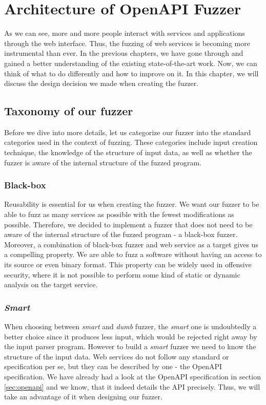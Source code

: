 \chapter{Architecture of OpenAPI Fuzzer}
As we can see, more and more people interact with services and applications through the web interface. Thus, the fuzzing of web services is becoming more instrumental than ever. In the previous chapters, we have gone through and gained a better understanding of the existing state-of-the-art work. Now, we can think of what to do differently and how to improve on it. In this chapter, we will discuss the design decision we made when creating the fuzzer.

\section{Taxonomy of our fuzzer}
Before we dive into more details, let us categorize our fuzzer into the standard categories used in the context of fuzzing. These categories include input creation technique, the knowledge of the structure of input data, as well as whether the fuzzer is aware of the internal structure of the fuzzed program.

\subsection{Black-box}
Reusability is essential for us when creating the fuzzer. We want our fuzzer to be able to fuzz as many services as possible with the fewest modifications as possible. Therefore, we decided to implement a fuzzer that does not need to be aware of the internal structure of the fuzzed program - a black-box fuzzer. Moreover, a combination of black-box fuzzer and web service as a target gives us a compelling property. We are able to fuzz a software without having an access to its source or even binary format. This property can be widely used in offensive security, where it is not possible to perform some kind of static or dynamic analysis on the target service.

\subsection{\textit{Smart}}
When choosing between \textit{smart} and \textit{dumb} fuzzer, the \textit{smart} one is undoubtedly a better choice since it produces less input, which would be rejected right away by the input parser program. However to build a \textit{smart} fuzzer we need to know the structure of the input data. Web services do not follow any standard or specification per se, but they can be described by one - the OpenAPI specification. We have already had a look at the OpenAPI specification in section \ref{sec:openapi} and we know, that it indeed details the API precisely. Thus, we will take an advantage of it when designing our fuzzer.

